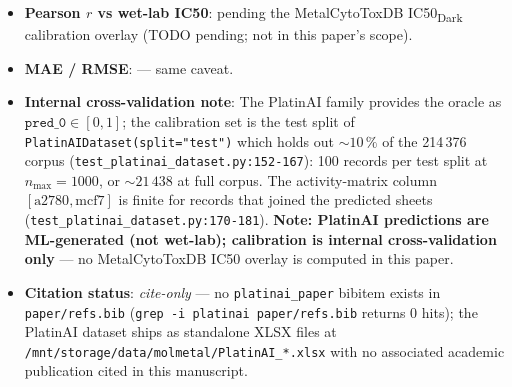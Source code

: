 \begin{itemize}
  \item \textbf{Pearson $r$ vs wet-lab IC50}: \DESIGN{} pending the
        MetalCytoToxDB IC50\textsubscript{Dark} calibration
        overlay (TODO pending; not in this paper's scope).
  \item \textbf{MAE / RMSE}: \DESIGN{} --- same caveat.
  \item \textbf{Internal cross-validation note}: The
        PlatinAI family provides the oracle as
        $\texttt{pred\_0} \in [0, 1]$; the calibration set is
        the test split of \texttt{PlatinAIDataset(split="test")}
        which holds out $\sim 10\,\%$ of the 214\,376 corpus
        (\texttt{test\_platinai\_dataset.py:152-167}):
        100 records per test split at $n_{\max}=1000$, or
        $\sim 21\,438$ at full corpus. The activity-matrix
        column $[\text{a2780}, \text{mcf7}]$ is finite for
        records that joined the predicted sheets
        (\texttt{test\_platinai\_dataset.py:170-181}).
        \textbf{Note: PlatinAI predictions are ML-generated
        (not wet-lab); calibration is internal
        cross-validation only} --- no MetalCytoToxDB IC50
        overlay is computed in this paper.
  \item \textbf{Citation status}:
        \emph{cite-only} --- no \texttt{platinai\_paper}
        bibitem exists in \texttt{paper/refs.bib}
        (\texttt{grep -i platinai paper/refs.bib} returns 0
        hits); the PlatinAI dataset ships as standalone
        XLSX files at
        \texttt{/mnt/storage/data/molmetal/PlatinAI\_*.xlsx}
        with no associated academic publication cited in
        this manuscript.
\end{itemize}

